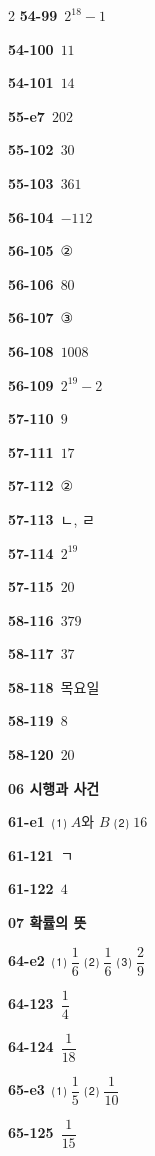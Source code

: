 \documentclass[10pt,a4paper]{article}
\begin{document}
\begin{multicols}{2}
\noindent\textbf{54-99}\ $2^{18}-1$\par
\noindent\textbf{54-100}\ $11$\par
\noindent\textbf{54-101}\ $14$\par
\noindent\textbf{55-e7}\ $202$\par
\noindent\textbf{55-102}\ $30$\par
\noindent\textbf{55-103}\ $361$\par
\noindent\textbf{56-104}\ $-112$\par
\noindent\textbf{56-105}\ ②\par
\noindent\textbf{56-106}\ $80$\par
\noindent\textbf{56-107}\ ③\par
\noindent\textbf{56-108}\ $1008$\par
\noindent\textbf{56-109}\ $2^{19}-2$\par
\noindent\textbf{57-110}\ $9$\par
\noindent\textbf{57-111}\ $17$\par
\noindent\textbf{57-112}\ ②\par
\noindent\textbf{57-113}\ ㄴ, ㄹ\par
\noindent\textbf{57-114}\ $2^{19}$\par
\noindent\textbf{57-115}\ $20$\par
\noindent\textbf{58-116}\ $379$\par
\noindent\textbf{58-117}\ $37$\par
\noindent\textbf{58-118}\ 목요일\par
\noindent\textbf{58-119}\ $8$\par
\noindent\textbf{58-120}\ $20$\par
\noindent\textbf{06 시행과 사건}\par\smallskip
\noindent\textbf{61-e1}\ ⑴ $A$와 $B$ ⑵ $16$\par
\noindent\textbf{61-121}\ ㄱ\par
\noindent\textbf{61-122}\ $4$\par
\noindent\textbf{07 확률의 뜻}\par\smallskip
\noindent\textbf{64-e2}\ ⑴ $\dfrac{1}{6}$ ⑵ $\dfrac{1}{6}$ ⑶ $\dfrac{2}{9}$\par
\noindent\textbf{64-123}\ $\dfrac{1}{4}$\par
\noindent\textbf{64-124}\ $\dfrac{1}{18}$\par
\noindent\textbf{65-e3}\ ⑴ $\dfrac{1}{5}$ ⑵ $\dfrac{1}{10}$\par
\noindent\textbf{65-125}\ $\dfrac{1}{15}$\par

\end{multicols}
\end{document}
